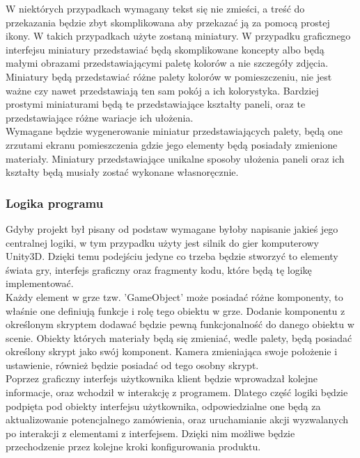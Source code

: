 \documentclass{article} %
\begin{document}
            W niektórych przypadkach wymagany tekst się nie zmieści, a treść do przekazania będzie zbyt skomplikowana aby przekazać ją za pomocą prostej ikony. W takich przypadkach użyte zostaną miniatury. W przypadku graficznego interfejsu miniatury przedstawiać będą skomplikowane koncepty albo będą małymi obrazami przedstawiającymi paletę kolorów a nie szczegóły zdjęcia. Miniatury będą przedstawiać różne palety kolorów w pomieszczeniu, nie jest ważne czy nawet przedstawiają ten sam pokój a ich kolorystyka. Bardziej prostymi miniaturami będą te przedstawiające kształty paneli, oraz te przedstawiające różne wariacje ich ułożenia.
            \\
            
            Wymagane będzie wygenerowanie miniatur przedstawiających palety, będą one zrzutami ekranu pomieszczenia gdzie jego elementy będą posiadały zmienione materiały. Miniatury przedstawiające unikalne sposoby ułożenia paneli oraz ich kształty będą musiały zostać wykonane własnoręcznie.
            \\
            
        \subsubsection{Logika programu}
        Gdyby projekt był pisany od podstaw wymagane byłoby napisanie jakieś jego centralnej logiki, w tym przypadku użyty jest silnik do gier komputerowy Unity3D. Dzięki temu podejściu jedyne co trzeba będzie stworzyć to elementy świata gry, interfejs graficzny oraz fragmenty kodu, które będą tę logikę implementować.
        \\
        
        Każdy element w grze tzw. 'GameObject' może posiadać różne komponenty, to właśnie one definiują funkcje i rolę tego obiektu w grze. Dodanie komponentu z określonym skryptem dodawać będzie pewną funkcjonalność do danego obiektu w scenie. Obiekty których materiały będą się zmieniać, wedle palety, będą posiadać określony skrypt jako swój komponent. Kamera zmieniająca swoje położenie i ustawienie, również będzie posiadać od tego osobny skrypt.
        \\
 
        Poprzez graficzny interfejs użytkownika klient będzie wprowadzał kolejne informacje, oraz wchodził w interakcję z programem. Dlatego część logiki będzie podpięta pod obiekty interfejsu użytkownika, odpowiedzialne one będą za aktualizowanie potencjalnego zamówienia, oraz uruchamianie akcji wyzwalanych po interakcji z elementami z interfejsem. Dzięki nim możliwe będzie przechodzenie przez kolejne kroki konfigurowania produktu.
        \\
        
\end{document}
